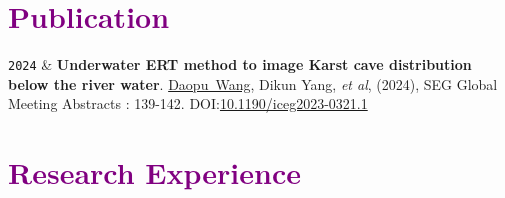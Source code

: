 \documentclass[10pt,a4paper]{article}
\newcommand{\FirstName}{Daopu}
\newcommand{\LastName}{Wang}
\newcommand{\Me}{\underline{\FirstName\  \LastName}}
\newcommand{\DikunYang}{Dikun Yang}
\newcommand{\Year}[1]{\fontsize{10pt}{0}\selectfont \texttt{#1}}
\begin{document}
\section{\textcolor{purple}{Publication}}

\begin{EntriesTableYear}
  \Year{2024} &
  \textbf{Underwater ERT method to image Karst cave distribution below the river water}.
  \newline
  \Me, \DikunYang, \emph{et al},
  (2024), SEG Global Meeting Abstracts : 139-142. %
  DOI:\href{https://library.seg.org/doi/10.1190/iceg2023-032.1}{10.1190/iceg2023-0321.1}
  \\
\end{EntriesTableYear}

\section{\textcolor{purple}{Research Experience}}
\end{document}
